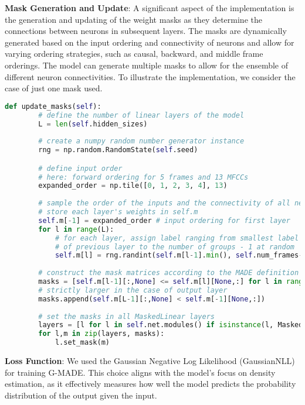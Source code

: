 \textbf{Mask Generation and Update}: A significant aspect of the implementation is the generation and updating of the weight masks as they determine the connections between neurons in subsequent layers. The masks are dynamically generated based on the input ordering and connectivity of neurons and allow for varying ordering strategies, such as causal, backward, and middle frame orderings. The model can generate multiple masks to allow for the ensemble of different neuron connectivities. To illustrate the implementation, we consider the case of just one mask used.
\begin{lstlisting}[language=Python,caption={PyTorch implementation of the mask generation, adapted from Karpathy, Andrej (2018)~\cite{githubMADE}}]
    def update_masks(self):
        # define the number of linear layers of the model
        L = len(self.hidden_sizes)
        
        # create a numpy random number generator instance
        rng = np.random.RandomState(self.seed)

        # define input order
        # here: forward ordering for 5 frames and 13 MFCCs
        expanded_order = np.tile([0, 1, 2, 3, 4], 13)
        
        # sample the order of the inputs and the connectivity of all neurons
        # store each layer's weights in self.m
        self.m[-1] = expanded_order # input ordering for first layer
        for l in range(L):
            # for each layer, assign label ranging from smallest label
            # of previous layer to the number of groups - 1 at random
            self.m[l] = rng.randint(self.m[l-1].min(), self.num_frames-1, size=self.hidden_sizes[l])
        
        # construct the mask matrices according to the MADE definition
        masks = [self.m[l-1][:,None] <= self.m[l][None,:] for l in range(L)]
        # strictly larger in the case of output layer
        masks.append(self.m[L-1][:,None] < self.m[-1][None,:])
        
        # set the masks in all MaskedLinear layers
        layers = [l for l in self.net.modules() if isinstance(l, MaskedLinear)]
        for l,m in zip(layers, masks):
            l.set_mask(m)
\end{lstlisting}
\textbf{Loss Function}: We used the Gaussian Negative Log Likelihood (GaussianNLL) for training G-MADE. This choice aligns with the model's focus on density estimation, as it effectively measures how well the model predicts the probability distribution of the output given the input.
